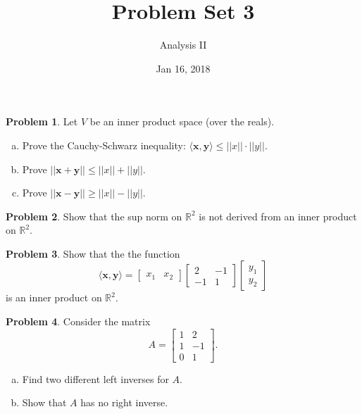 \documentclass{amsart}
\newcommand{\+}[1]{\ensuremath{\mathbf{#1}}}
\newcommand{\R}{{\mathbb R}}
\theoremstyle{definition}
\newtheorem{prob}{Problem}
\begin{document}
\title{Problem Set 3}
\date{Jan 16, 2018}
\author{Analysis II}

\maketitle

\begin{prob}
 Let $V$ be an inner product space (over the reals).
 \begin{enumerate}[(a)]
  \item Prove the Cauchy-Schwarz inequality: $\langle \+x, \+y\rangle \leq ||x|| \cdot ||y||.$
  \item Prove $||\+x + \+y|| \leq ||x|| + ||y||$.
  \item Prove $||\+x - \+y|| \geq ||x|| - ||y||$.
 \end{enumerate}
\end{prob}


\begin{prob}
Show that the sup norm on $\R^2$ is not
derived from an inner product on $\R^2$.
\end{prob}

\begin{prob}
 Show that the the function
 \[
\langle \+x, \+y\rangle  = 
\begin{bmatrix}
x_1 & x_2 
\end{bmatrix}
\begin{bmatrix}
2 & -1 \\ -1 & 1 
\end{bmatrix}
\begin{bmatrix}
y_1 \\ y_2 
\end{bmatrix}
 \]
is an inner product on $\R^2$.
\end{prob}


\begin{prob}
 Consider the matrix
 \[
 A = \begin{bmatrix}
1 & 2 \\ 1 & -1 \\ 0 & 1 
\end{bmatrix}.
\]
\begin{enumerate}[(a)]
 \item Find two different left inverses for $A$.
 \item Show that $A$ has no right inverse.
\end{enumerate}
\end{prob}
\end{document}

